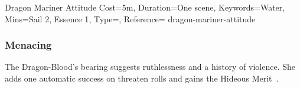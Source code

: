 \begin{Charm}{Dragon Mariner Attitude}{%
    Cost=5m,
    Duration=One scene,
    Keywords=Water,
    Mins={Sail 2, Essence 1},
    Type=\ReflexiveType,
    Reference=\cite*[p.~257]{db}
}{dragon-mariner-attitude}
    \subsubsection{Menacing}
    The Dragon-Blood's bearing suggests ruthlessness and a history of violence. She
    adds one automatic success on threaten rolls and gains the Hideous
    Merit~\parencite*[p.~162]{ex3}.
\end{Charm}


\printbibliography[title=References]


\onecolumn
\pagestyle{empty}
\cleardoublepage{}

\pagestyle{main}

\PrintCharmList{}


